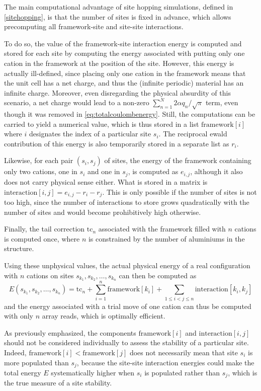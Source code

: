 \documentclass[main.tex]{subfiles}
\begin{document}
The main computational advantage of site hopping simulations, defined in \cref{sitehopping}, is that the number of sites is fixed in advance, which allows precomputing all framework-site and site-site interactions.

To do so, the value of the framework-site interaction energy is computed and stored for each site by computing the energy associated with putting only one cation in the framework at the position of the site. However, this energy is actually ill-defined, since placing only one cation in the framework means that the unit cell has a net charge, and thus the (infinite periodic) material has an infinite charge. Moreover, even disregarding the physical absurdity of this scenario, a net charge would lead to a non-zero $\sum_{n=1}^N2\alpha q_n/\sqrt\pi$ term, even though it was removed in \cref{eq:totalcoulombenergy}. Still, the computations can be carried to yield a numerical value, which is thus stored in a list $\text{framework}[i]$ where $i$ designates the index of a particular site $s_i$. The reciprocal ewald contribution of this energy is also temporarily stored in a separate list as $r_i$.

Likewise, for each pair $(s_i,s_j)$ of sites, the energy of the framework containing only two cations, one in $s_i$ and one in $s_j$, is computed as $e_{i,j}$, although it also does not carry physical sense either. What is stored in a matrix is
$\text{interaction}[i,j] = e_{i,j} - r_i - r_j$.
This is only possible if the number of sites is not too high, since the number of interactions to store grows quadratically with the number of sites and would become prohibitively high otherwise.

Finally, the tail correction $\text{tc}_n$ associated with the framework filled with $n$ cations is computed once, where $n$ is constrained by the number of aluminiums in the structure.

Using these unphysical values, the actual physical energy of a real configuration with $n$ cations on sites $s_{k_1}, s_{k_2}, \ldots, s_{k_n}$ can then be computed as
\[E(s_{k_1}, s_{k_2}, \ldots, s_{k_n}) = \text{tc}_n + \sum_{i=1}^n\text{framework}[k_i] + \sum_{1\le i<j \le n}\text{interaction}[k_i,k_j]\]
and the energy associated with a trial move of one cation can thus be computed with only $n$ array reads, which is optimally efficient.

As previously emphasized, the components $\text{framework}[i]$ and $\text{interaction}[i,j]$ should not be considered individually to assess the stability of a particular site. Indeed, $\text{framework}[i] < \text{framework}[j]$ does not necessarily mean that site $s_i$ is more populated than $s_j$, because the site-site interaction energies could make the total energy $E$ systematically higher when $s_i$ is populated rather than $s_j$, which is the true measure of a site stability.
\end{document}
